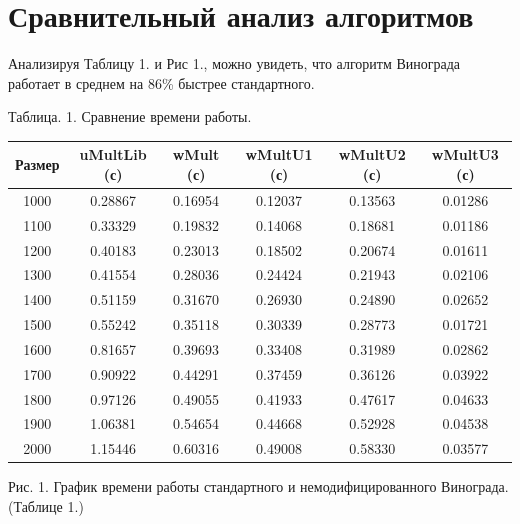\documentclass[12pt]{report}
\begin{document}
\section{Сравнительный анализ алгоритмов}

Анализируя Таблицу 1. и Рис 1., можно увидеть, что алгоритм Винограда работает в среднем на 86\% быстрее стандартного.

\begin{center}
Таблица. 1. Сравнение времени работы.   
	\begin{tabular}{|c c c c c c|} 
 	\hline
	Размер & uMultLib (с) & wMult (с) & wMultU1 (с) & wMultU2 (с) & wMultU3 (с) \\ [0.5ex] 
 	\hline\hline
 	1000 &  0.28867 & 0.16954 & 0.12037 & 0.13563 & 0.01286 \\
 	\hline
 	1100 &  0.33329 & 0.19832 & 0.14068 & 0.18681 & 0.01186 \\
 	\hline
	1200 &  0.40183 & 0.23013 & 0.18502 & 0.20674 & 0.01611 \\
	\hline
	1300 &  0.41554 & 0.28036 & 0.24424 & 0.21943 & 0.02106 \\
	\hline
	1400 &  0.51159 & 0.31670 & 0.26930 & 0.24890 & 0.02652 \\
	\hline
	1500 &  0.55242 & 0.35118 & 0.30339 & 0.28773 & 0.01721 \\
	\hline
	1600 &  0.81657 & 0.39693 & 0.33408 & 0.31989 & 0.02862 \\
	\hline
	1700 &  0.90922 & 0.44291 & 0.37459 & 0.36126 & 0.03922 \\
	\hline
	1800 &  0.97126 & 0.49055 & 0.41933 & 0.47617 & 0.04633 \\
	\hline
	1900 &  1.06381 & 0.54654 & 0.44668 & 0.52928 & 0.04538 \\
	\hline
	2000 &  1.15446 & 0.60316 & 0.49008 & 0.58330 & 0.03577 \\
	\hline
	\end{tabular}
\end{center}

\begin{center}

Рис. 1. График времени работы стандартного и немодифицированного Винограда. (Таблице 1.)
\end{center}
\end{document}
